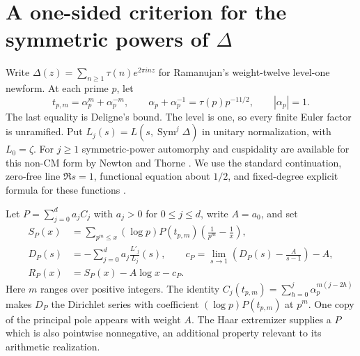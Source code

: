 \section{A one-sided criterion for the symmetric powers of \texorpdfstring{$\Delta$}{Delta}}\label{sec:analytic}

Write $\Delta(z)=\sum_{n\ge1}\tau(n)e^{2\pi i nz}$ for Ramanujan's weight-twelve level-one newform. At each prime $p$, let
\[
 t_{p,m}=\alpha_p^m+\alpha_p^{-m},\qquad
 \alpha_p+\alpha_p^{-1}=\tau(p)p^{-11/2},\qquad |\alpha_p|=1 .
\]
The last equality is Deligne's bound. The level is one, so every finite Euler factor is unramified. Put $L_j(s)=L(s,\operatorname{Sym}^j\Delta)$ in unitary normalization, with $L_0=\zeta$. For $j\ge1$ symmetric-power automorphy and cuspidality are available for this non-CM form by Newton and Thorne \cite{nt}. We use the standard continuation, zero-free line $\Re s=1$, functional equation about $1/2$, and fixed-degree explicit formula for these functions \cite{nt,rtc}.

Let $P=\sum_{j=0}^{d}a_j C_j$ with $a_j>0$ for $0\le j\le d$, write $A=a_0$, and set
\begin{align*}
 S_P(x)&=\sum_{p^m\le x}(\log p)P(t_{p,m})
             \left(\frac1{p^m}-\frac1x\right),\\
 D_P(s)&=-\sum_{j=0}^{d}a_j\frac{L'_j}{L_j}(s),\qquad
 c_P=\lim_{s\to1}\left(D_P(s)-\frac{A}{s-1}\right)-A,\\
 R_P(x)&=S_P(x)-A\log x-c_P.
\end{align*}
Here $m$ ranges over positive integers. The identity
$C_j(t_{p,m})=\sum_{h=0}^j\alpha_p^{m(j-2h)}$
makes $D_P$ the Dirichlet series with coefficient $(\log p)P(t_{p,m})$ at $p^m$. One copy of the principal pole appears with weight $A$. The Haar extremizer supplies a $P$ which is also pointwise nonnegative, an additional property relevant to its arithmetic realization.

